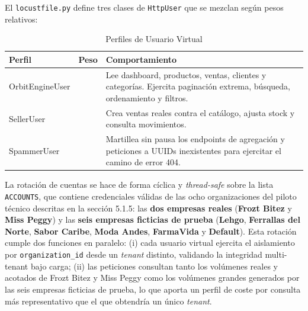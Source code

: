 El \texttt{locustfile.py} define tres clases de \texttt{HttpUser} que se mezclan según pesos relativos:

\begin{longtable}[]{@{}
  >{\raggedright\arraybackslash}p{}
  >{\raggedright\arraybackslash}p{}
  >{\raggedright\arraybackslash}p{}@{}}
\caption[Perfiles de Usuario Virtual]{Perfiles de Usuario Virtual}\tabularnewline
\toprule\noalign{}
\begin{minipage}[b]{\linewidth}\raggedright
Perfil
\end{minipage} & \begin{minipage}[b]{\linewidth}\raggedright
Peso
\end{minipage} & \begin{minipage}[b]{\linewidth}\raggedright
Comportamiento
\end{minipage} \\
\midrule\noalign{}
\endhead
\bottomrule\noalign{}
\endlastfoot
OrbitEngineUser & 3 & Lee dashboard, productos, ventas, clientes y categorías. Ejercita paginación extrema, búsqueda, ordenamiento y filtros. \\
SellerUser & 2 & Crea ventas reales contra el catálogo, ajusta stock y consulta movimientos. \\
SpammerUser & 1 & Martillea sin pausa los endpoints de agregación y peticiones a UUIDs inexistentes para ejercitar el camino de error 404. \\
\end{longtable}

La rotación de cuentas se hace de forma cíclica y \emph{thread-safe} sobre la lista \texttt{ACCOUNTS}, que contiene credenciales válidas de las ocho organizaciones del piloto técnico descritas en la sección 5.1.5: las \textbf{dos empresas reales} (\textbf{Frozt Bitez} y \textbf{Miss Peggy}) y las \textbf{seis empresas ficticias de prueba} (\textbf{Lehgo}, \textbf{Ferrallas del Norte}, \textbf{Sabor Caribe}, \textbf{Moda Andes}, \textbf{FarmaVida} y \textbf{Default}). Esta rotación cumple dos funciones en paralelo: (i) cada usuario virtual ejercita el aislamiento por \texttt{organization\_id} desde un \emph{tenant} distinto, validando la integridad multi-tenant bajo carga; (ii) las peticiones consultan tanto los volúmenes reales y acotados de Frozt Bitez y Miss Peggy como los volúmenes grandes generados por las seis empresas ficticias de prueba, lo que aporta un perfil de coste por consulta más representativo que el que obtendría un único \emph{tenant}.

